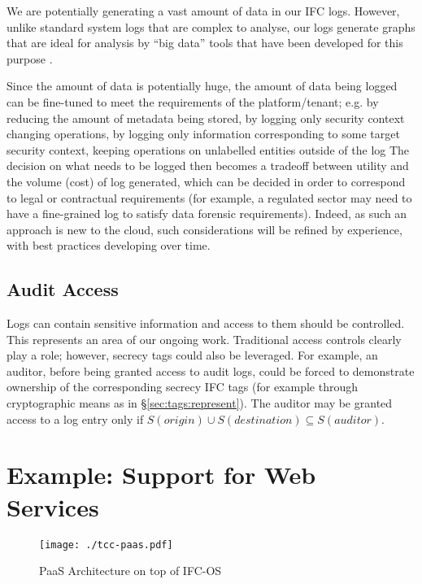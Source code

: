 \documentclass[10pt,journal,compsoc]{IEEEtran}
\begin{document}
We are potentially generating a vast amount of data in our IFC logs. 
However, unlike standard system logs that are complex to analyse, our logs generate graphs that are ideal for analysis by ``big data'' tools that have been developed for this purpose \cite{angles2008survey}.

Since the amount of data is potentially huge, the amount of data being logged can be fine-tuned to meet the requirements of the platform/tenant; e.g. 
by reducing the amount of metadata being stored, by logging only security context changing operations, by logging only information corresponding to some target security context, keeping operations on unlabelled entities outside of the log \etc
The decision on what needs to be logged then becomes a tradeoff between utility and the volume (cost) of log generated, which can be decided in order to correspond to legal or contractual requirements (for example, a regulated sector may need to have a fine-grained log to satisfy data forensic requirements). Indeed, as such an approach is new to the cloud, such considerations will be refined by experience, with best practices developing over time.

\subsection{Audit Access}

Logs can contain sensitive information and access to them should be controlled. 
This represents an area of our ongoing work.
 Traditional access controls clearly play a role; however, secrecy tags could also be leveraged.
For example, an auditor, before being granted access to audit logs, could be forced to demonstrate ownership of the corresponding secrecy IFC tags (for example through cryptographic means as in \S\ref{sec:tags:represent}).
The auditor may be granted access to a log entry only if $S(\mathit{origin})\cup S(\mathit{destination}) \subseteq S(\mathit{auditor})$.





 
\section{Example: Support for Web Services}
\label{sec:example}
\begin{figure*}[t]
\centering
  \texttt{[image: ./tcc-paas.pdf]}
  \caption{PaaS Architecture on top of IFC-OS}
  \label{image:untrusted:paas}
\end{figure*}
\end{document}
